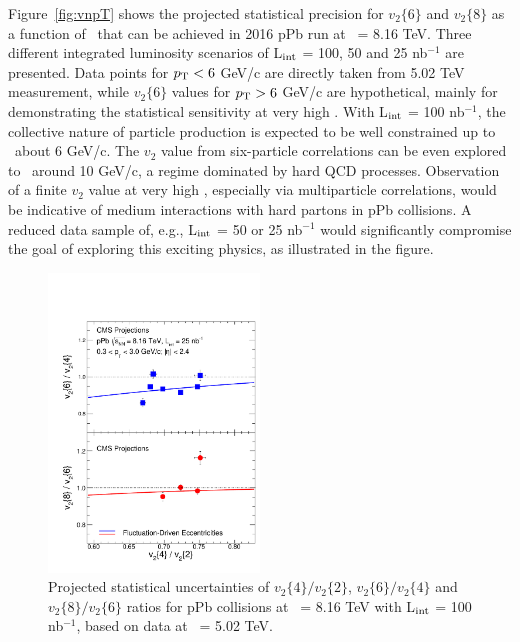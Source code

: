 Figure~\ref{fig:vnpT} shows the projected statistical precision for $v_{2}\{6\}$
and $v_{2}\{8\}$ as a function of \pt\ that can be achieved in 2016 pPb run at 
\rootsNN\ = 8.16 TeV. Three different integrated luminosity scenarios of L$_{\rm int}$ = 
100, 50 and 25 nb$^{-1}$ are presented. Data points for $p_\mathrm{T}<6$ GeV/c are directly 
taken from 5.02 TeV measurement, while $v_{2}\{6\}$ values for $p_\mathrm{T}>6$ GeV/c are 
hypothetical, mainly for demonstrating the statistical sensitivity at very high \pt.
With L$_{\rm int}$ = 100 nb$^{-1}$, the collective nature of particle production 
is expected to be well constrained up to \pt\ about 6 GeV/c.
The $v_2$ value from six-particle correlations can be even explored to \pt\ around 10 GeV/c, 
a regime dominated by hard QCD processes. Observation of a finite $v_2$ value at very 
high \pt, especially via multiparticle correlations, would be indicative 
of medium interactions with hard partons in pPb collisions. A reduced data sample
of, e.g., L$_{\rm int}$ = 50 or 25 nb$^{-1}$ would significantly compromise 
the goal of exploring this exciting physics, as illustrated in the figure.

\begin{figure}[t!]
  \begin{center}
    \includegraphics[width=0.5\textwidth]{figures/vnRatios_proj_100nb.pdf}
    \caption{ Projected statistical uncertainties of $v_2\{4\}/v_2\{2\}$, $v_2\{6\}/v_2\{4\}$ and $v_2\{8\}/v_2\{6\}$ ratios
    for pPb collisions at \rootsNN\ = 8.16 TeV with L$_{\rm int}$ = 100 nb$^{-1}$, based on data at \rootsNN\ = 5.02 TeV.
    }
    \label{fig:vnNtrk}
  \end{center}
\end{figure}

